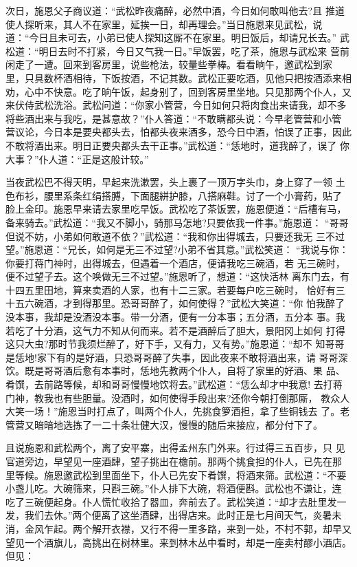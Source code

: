 次日，施恩父子商议道：“武松昨夜痛醉，必然中酒，今日如何敢叫他去?且
推道使人探听来，其人不在家里，延挨一日，却再理会。”当日施恩来见武松，说
道：“今日且未可去，小弟已使人探知这厮不在家里。明日饭后，却请兄长去。”
武松道：“明日去时不打紧，今日又气我一日。”早饭罢，吃了茶，施恩与武松来
营前闲走了一遭。回来到客房里，说些枪法，较量些拳棒。看看晌午，邀武松到家
里，只具数杯酒相待，下饭按酒，不记其数。武松正要吃酒，见他只把按酒添来相
劝，心中不快意。吃了晌午饭，起身别了，回到客房里坐地。只见那两个仆人，又
来伏侍武松洗浴。武松问道：“你家小管营，今日如何只将肉食出来请我，却不多
将些酒出来与我吃，是甚意故？”仆人答道：“不敢瞒都头说：今早老管营和小管
营议论，今日本是要央都头去，怕都头夜来酒多，恐今日中酒，怕误了正事，因此
不敢将酒出来。明日正要央都头去干正事。”武松道：“恁地时，道我醉了，误了
你大事？”仆人道：“正是这般计较。”

当夜武松巴不得天明，早起来洗漱罢，头上裹了一顶万字头巾，身上穿了一领
土色布衫，腰里系条红绢搭膊，下面腿絣护膝，八搭麻鞋。讨了一个小膏药，贴了
脸上金印。施恩早来请去家里吃早饭。武松吃了茶饭罢，施恩便道：“后槽有马，
备来骑去。”武松道：“我又不脚小，骑那马怎地?只要依我一件事。”施恩道：
“哥哥但说不妨，小弟如何敢道不依？”武松道：“我和你出得城去，只要还我无
三不过望。”施恩道：“兄长，如何是无三不过望?小弟不省其意。”武松笑道：
“我说与你：你要打蒋门神时，出得城去，但遇着一个酒店，便请我吃三碗酒，若
无三碗时，便不过望子去。这个唤做无三不过望。”施恩听了，想道：“这快活林
离东门去，有十四五里田地，算来卖酒的人家，也有十二三家。若要每户吃三碗时，
恰好有三十五六碗酒，才到得那里。恐哥哥醉了，如何使得？”武松大笑道：“你
怕我醉了没本事，我却是没酒没本事。带一分酒，便有一分本事；五分酒，五分本
事。我若吃了十分酒，这气力不知从何而来。若不是酒醉后了胆大，景阳冈上如何
打得这只大虫?那时节我须烂醉了，好下手，又有力，又有势。”施恩道：“却不
知哥哥是恁地!家下有的是好酒，只恐哥哥醉了失事，因此夜来不敢将酒出来，请
哥哥深饮。既是哥哥酒后愈有本事时，恁地先教两个仆人，自将了家里的好酒、果
品、肴馔，去前路等候，却和哥哥慢慢地饮将去。”武松道：“恁么却才中我意!
去打蒋门神，教我也有些胆量。没酒时，如何使得手段出来?还你今朝打倒那厮，
教众人大笑一场！”施恩当时打点了，叫两个仆人，先挑食箩酒担，拿了些铜钱去
了。老管营又暗暗地选拣了一二十条壮健大汉，慢慢的随后来接应，都分付下了。

且说施恩和武松两个，离了安平寨，出得孟州东门外来。行过得三五百步，只
见官道旁边，早望见一座酒肆，望子挑出在檐前。那两个挑食担的仆人，已先在那
里等候。施恩邀武松到里面坐下，仆人已先安下肴馔，将酒来筛。武松道：“不要
小盏儿吃。大碗筛来，只斟三碗。”仆人排下大碗，将酒便斟。武松也不谦让，连
吃了三碗便起身。仆人慌忙收拾了器皿，奔前去了。武松笑道：“却才去肚里发一
发，我们去休。”两个便离了这坐酒肆，出得店来。此时正是七月间天气，炎暑未
消，金风乍起。两个解开衣襟，又行不得一里多路，来到一处，不村不郭，却早又
望见一个酒旗儿，高挑出在树林里。来到林木丛中看时，却是一座卖村醪小酒店。
但见：

